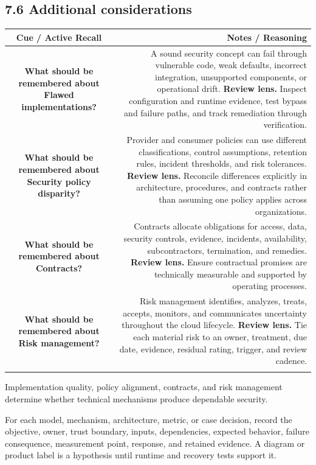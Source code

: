 \documentclass[11pt]{article}
\newcommand{\CornellHeader}{\rowcolor{Navy}\color{white}\bfseries Cue / Active Recall & \color{white}\bfseries Notes / Reasoning \\\endhead}
\newcommand{\CornellRow}[2]{\cellcolor{CueGray}\textbf{#1} & #2 \\\addlinespace[3pt]}
\begin{document}
\subsection{7.6 Additional considerations}
\begin{longtable}{@{}C N@{}}
\CornellHeader
\CornellRow{What should be remembered about Flawed implementations?}{A sound security concept can fail through vulnerable code, weak defaults, incorrect integration, unsupported components, or operational drift. \textbf{Review lens.} Inspect configuration and runtime evidence, test bypass and failure paths, and track remediation through verification.}
\CornellRow{What should be remembered about Security policy disparity?}{Provider and consumer policies can use different classifications, control assumptions, retention rules, incident thresholds, and risk tolerances. \textbf{Review lens.} Reconcile differences explicitly in architecture, procedures, and contracts rather than assuming one policy applies across organizations.}
\CornellRow{What should be remembered about Contracts?}{Contracts allocate obligations for access, data, security controls, evidence, incidents, availability, subcontractors, termination, and remedies. \textbf{Review lens.} Ensure contractual promises are technically measurable and supported by operating processes.}
\CornellRow{What should be remembered about Risk management?}{Risk management identifies, analyzes, treats, accepts, monitors, and communicates uncertainty throughout the cloud lifecycle. \textbf{Review lens.} Tie each material risk to an owner, treatment, due date, evidence, residual rating, trigger, and review cadence.}
\end{longtable}
\begin{sectionsummarybox}
Implementation quality, policy alignment, contracts, and risk management determine whether technical mechanisms produce dependable security.
\end{sectionsummarybox}
\begin{practicebox}
For each model, mechanism, architecture, metric, or case decision, record the objective, owner, trust boundary, inputs, dependencies, expected behavior, failure consequence, measurement point, response, and retained evidence. A diagram or product label is a hypothesis until runtime and recovery tests support it.
\end{practicebox}
\end{document}
